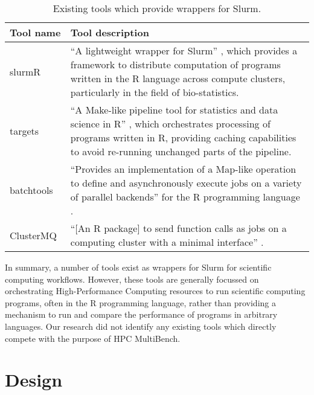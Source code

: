 \begin{table}[H]
    \caption{Existing tools which provide wrappers for Slurm.}
    \label{tab:hpc-multibench-existing-tools}
    \begin{tabular}{|p{0.2\linewidth}|p{0.8\linewidth}|}
    \hline
    \textbf{Tool name}  & \textbf{Tool description} \\ \hline\hline
    slurmR     & ``A lightweight wrapper for Slurm'' \cite{gvegayonJournalOpenSource}, which provides a framework to distribute computation of programs written in the R language across compute clusters, particularly in the field of bio-statistics. \\ \hline
    targets    & ``A Make-like pipeline tool for statistics and data science in R'' \cite{landauTargetsPackageDynamic2021}, which orchestrates processing of programs written in R, providing caching capabilities to avoid re-running unchanged parts of the pipeline. \\ \hline
    batchtools & ``Provides an implementation of a Map-like operation to define and asynchronously execute jobs on a variety of parallel backends'' for the R programming language \cite{langBatchtoolsToolsWork2017}. \\ \hline
    ClusterMQ  & ``[An R package] to send function calls as jobs on a computing cluster with a minimal interface'' \cite{schubertClustermqEnablesEfficient2019}. \\ \hline
    \end{tabular}
\end{table}

In summary, a number of tools exist as wrappers for Slurm for scientific computing workflows. However, these tools are generally focussed on orchestrating High-Performance Computing resources to run scientific computing programs, often in the R programming language, rather than providing a mechanism to run and compare the performance of programs in arbitrary languages. Our research did not identify any existing tools which directly compete with the purpose of HPC MultiBench.

\section{Design}
\label{sec:hpc-multibench-design} %


